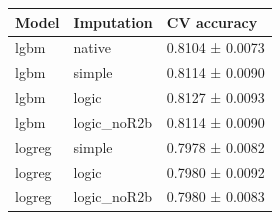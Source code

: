 \begin{tabular}{lll}
\toprule
Model & Imputation & CV accuracy \\
\midrule
lgbm & native & 0.8104 ± 0.0073 \\
lgbm & simple & 0.8114 ± 0.0090 \\
lgbm & logic & 0.8127 ± 0.0093 \\
lgbm & logic_noR2b & 0.8114 ± 0.0090 \\
logreg & simple & 0.7978 ± 0.0082 \\
logreg & logic & 0.7980 ± 0.0092 \\
logreg & logic_noR2b & 0.7980 ± 0.0083 \\
\bottomrule
\end{tabular}

